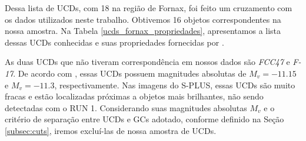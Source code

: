 Dessa lista de UCDs, com 18 na região de Fornax, foi feito um cruzamento com os dados utilizados neste trabalho. Obtivemos 16 objetos correspondentes na nossa amostra. Na Tabela \ref{ucds_fornax_propriedades}, apresentamos a lista dessas UCDs conhecidas e suas propriedades fornecidas por \cite{Mieske_2008_2}.

As duas UCDs que não tiveram correspondência em nossos dados são \textit{FCC47} e \textit{F-17}. De acordo com \cite{Fahrion_2020}, essas UCDs possuem magnitudes absolutas de $M_v = -11.15$ e $M_v = -11.3$, respectivamente. Nas imagens do S-PLUS, essas UCDs são muito fracas e estão localizadas próximas a objetos mais brilhantes, não sendo detectadas com o RUN 1. Considerando suas magnitudes absolutas $M_v$ e o critério de separação entre UCDs e GCs adotado, conforme definido na Seção \ref{subsec:cuts}, iremos excluí-las de nossa amostra de UCDs.

